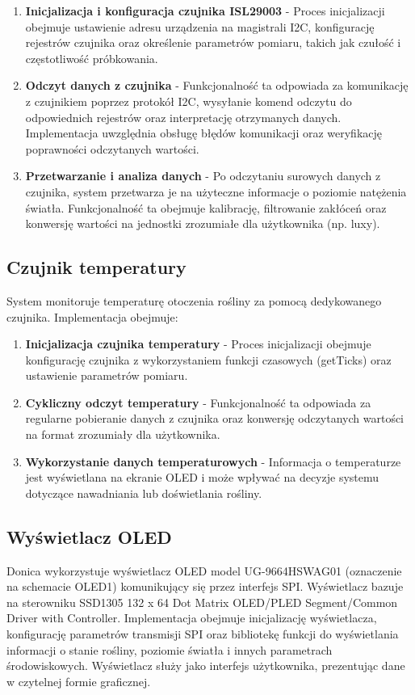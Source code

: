 \documentclass{article}
\begin{document}
\begin{enumerate}
    \item \textbf{Inicjalizacja i konfiguracja czujnika ISL29003} - Proces inicjalizacji obejmuje ustawienie adresu urządzenia na magistrali I2C, konfigurację rejestrów czujnika oraz określenie parametrów pomiaru, takich jak czułość i częstotliwość próbkowania.

    \item \textbf{Odczyt danych z czujnika} - Funkcjonalność ta odpowiada za komunikację z czujnikiem poprzez protokół I2C, wysyłanie komend odczytu do odpowiednich rejestrów oraz interpretację otrzymanych danych. Implementacja uwzględnia obsługę błędów komunikacji oraz weryfikację poprawności odczytanych wartości.

    \item \textbf{Przetwarzanie i analiza danych} - Po odczytaniu surowych danych z czujnika, system przetwarza je na użyteczne informacje o poziomie natężenia światła. Funkcjonalność ta obejmuje kalibrację, filtrowanie zakłóceń oraz konwersję wartości na jednostki zrozumiałe dla użytkownika (np. luxy).
\end{enumerate}

\subsection{Czujnik temperatury}
System monitoruje temperaturę otoczenia rośliny za pomocą dedykowanego czujnika. Implementacja obejmuje:

\begin{enumerate}
    \item \textbf{Inicjalizacja czujnika temperatury} - Proces inicjalizacji obejmuje konfigurację czujnika z wykorzystaniem funkcji czasowych (getTicks) oraz ustawienie parametrów pomiaru.
    
    \item \textbf{Cykliczny odczyt temperatury} - Funkcjonalność ta odpowiada za regularne pobieranie danych z czujnika oraz konwersję odczytanych wartości na format zrozumiały dla użytkownika.
    
    \item \textbf{Wykorzystanie danych temperaturowych} - Informacja o temperaturze jest wyświetlana na ekranie OLED i może wpływać na decyzje systemu dotyczące nawadniania lub doświetlania rośliny.
\end{enumerate}

\subsection{Wyświetlacz OLED}
Donica wykorzystuje wyświetlacz OLED model UG-9664HSWAG01 (oznaczenie na schemacie OLED1) komunikujący się przez interfejs SPI. Wyświetlacz bazuje na sterowniku SSD1305 132 x 64 Dot Matrix OLED/PLED Segment/Common Driver with Controller. Implementacja obejmuje inicjalizację wyświetlacza, konfigurację parametrów transmisji SPI oraz bibliotekę funkcji do wyświetlania informacji o stanie rośliny, poziomie światła i innych parametrach środowiskowych. Wyświetlacz służy jako interfejs użytkownika, prezentując dane w czytelnej formie graficznej.
\end{document}
